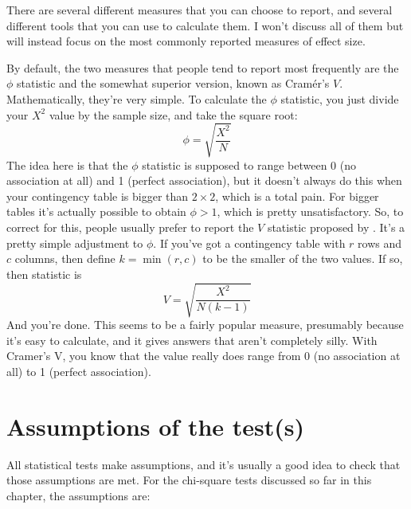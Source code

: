 There are several different measures that you can choose to report, and several different tools that you can use to calculate them. I won't discuss all of them but will instead focus on the most commonly reported measures of effect size. 

By default, the two measures that people tend to report most frequently are the $\phi$ statistic and the somewhat superior version, known as  Cram\'er's $V$. Mathematically, they're very simple. To calculate the $\phi$ statistic, you just divide your $X^2$ value by the sample size, and take the square root:
$$
\phi = \sqrt{\frac{X^2}{N}}
$$
The idea here is that the $\phi$ statistic is supposed to range between 0 (no association at all) and 1 (perfect association), but it doesn't always do this when your contingency table is bigger than $2 \times 2$, which is a total pain. For bigger tables it's actually possible to obtain $\phi>1$, which is pretty unsatisfactory. So, to correct for this, people usually prefer to report the $V$ statistic proposed by \textcite{Cramer1946}. It's a pretty simple adjustment to $\phi$. If you've got a contingency table with $r$ rows and $c$ columns, then define $k = \min(r,c)$ to be the smaller of the two values. If so, then  statistic is
$$
V = \sqrt{\frac{X^2}{N(k-1)}}
$$
And you're done. This seems to be a fairly popular measure, presumably because it's easy to calculate, and it gives answers that aren't completely silly. With Cramer’s V, you know that the value really does range from 0 (no association at all) to 1 (perfect association). 


\section{Assumptions of the test(s)~\label{sec:chisqassumptions}}

All statistical tests make assumptions, and it's usually a good idea to check that those assumptions are met. For the chi-square tests discussed so far in this chapter, the assumptions are:

